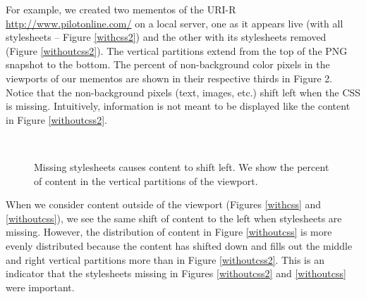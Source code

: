 For example, we created two mementos of the URI-R \url{http://www.pilotonline.com/} on a local server, one as it appears live (with all stylesheets -- Figure \ref{withcss2}) and the other with its stylesheets removed (Figure \ref{withoutcss2}). The vertical partitions extend from the top of the PNG snapshot to the bottom.
 The percent of non-background color pixels in the viewports of our mementos are shown in their respective thirds in Figure 2. Notice that the non-background pixels (text, images, etc.) shift left when the CSS is missing. Intuitively, information is not meant to be displayed like the content in Figure \ref{withoutcss2}.

\begin{figure}[h!]
  \begin{center}
    \\
  \end{center}
  \label{pilotexample2}
  \caption{Missing stylesheets causes content to shift left. We show the percent of content in the vertical partitions of the viewport.}
\end{figure}

When we consider content outside of the viewport (Figures \ref{withcss} and \ref{withoutcss}), we see the same shift of content to the left when stylesheets are missing. However, the distribution of content in Figure \ref{withoutcss} is more evenly distributed because the content has shifted down and fills out the middle and right vertical partitions more than in Figure \ref{withoutcss2}. This is an indicator that the stylesheets missing in Figures \ref{withoutcss2} and \ref{withoutcss} were important.

